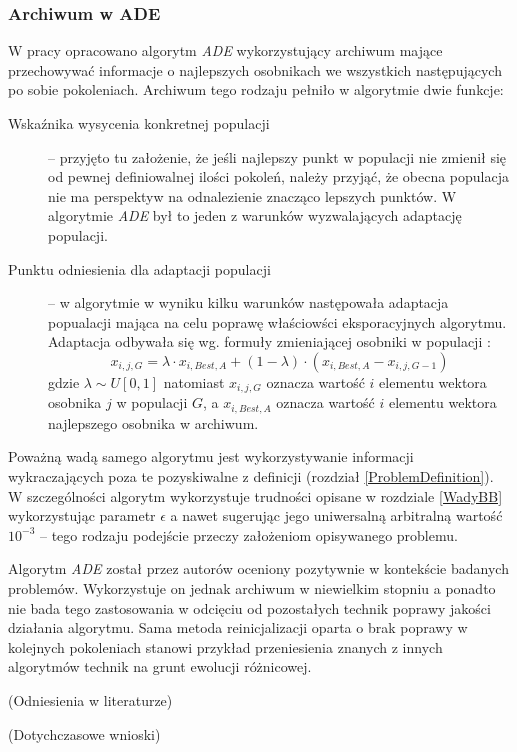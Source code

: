 \documentclass[12pt,a4paper]{report}
\begin{document}
{{{\subsubsection{Archiwum w ADE}
\par{
W pracy \cite{ArchivedDE} opracowano algorytm \emph{ADE} wykorzystujący archiwum mające przechowywać informacje o najlepszych osobnikach we wszystkich następujących po sobie pokoleniach. Archiwum tego rodzaju pełniło w algorytmie dwie funkcje:
\begin{description}
\item[Wskaźnika wysycenia konkretnej populacji] -- przyjęto tu założenie, że jeśli najlepszy punkt w populacji nie zmienił się od pewnej definiowalnej ilości pokoleń, należy przyjąć, że obecna populacja nie ma perspektyw na odnalezienie znacząco lepszych punktów. W algorytmie \emph{ADE} był to jeden z warunków wyzwalających adaptację populacji.
\item[Punktu odniesienia dla adaptacji populacji] -- w algorytmie w wyniku kilku warunków następowała adaptacja popualacji mająca na celu poprawę właściowści eksporacyjnych algorytmu. Adaptacja odbywała się wg. formuły zmieniającej osobniki w populacji \cite{ArchivedDE}:
\begin{equation}
x_{i,j,G} = \lambda \cdot x_{i,Best,A} + (1 - \lambda) \cdot (x_{i,Best,A} - x_{i,j,G-1})
\end{equation}
gdzie $\lambda \sim U[0,1]$ natomiast $x_{i,j,G}$ oznacza wartość $i$ elementu wektora osobnika $j$ w populacji $G$, a $x_{i,Best,A}$ oznacza wartość $i$ elementu wektora najlepszego osobnika w archiwum.
\end{description}
}
\par{
Poważną wadą samego algorytmu jest wykorzystywanie informacji wykraczających poza te pozyskiwalne z definicji (rozdział \ref{ProblemDefinition}). W szczególności algorytm wykorzystuje trudności opisane w rozdziale \ref{WadyBB} wykorzystując parametr $\epsilon$ a nawet sugerując jego uniwersalną arbitralną wartość $10^{-3}$ -- tego rodzaju podejście przeczy założeniom opisywanego problemu.
}
\par{
Algorytm \emph{ADE} został przez autorów oceniony pozytywnie w kontekście badanych problemów. Wykorzystuje on jednak archiwum w niewielkim stopniu a ponadto nie bada tego zastosowania w odcięciu od pozostałych technik poprawy jakości działania algorytmu. Sama metoda reinicjalizacji oparta o brak poprawy w kolejnych pokoleniach stanowi przykład przeniesienia znanych z innych algorytmów technik na grunt ewolucji różnicowej.
}
\par{
(Odniesienia w literaturze)
\cite{JADE,SHADE,ClusterArchiveDE,RobustArchiveDE,ArchivedDE,JADE2}
}
\par{(Dotychczasowe wnioski)}

}}}
\end{document}
